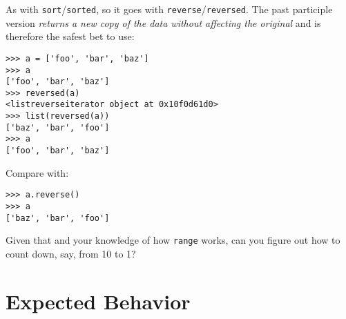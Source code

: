\documentclass[]{article}
\begin{document}
As with \texttt{sort}/\texttt{sorted}, so it goes with
\texttt{reverse}/\texttt{reversed}. The past participle version
\emph{returns a new copy of the data without affecting the original} and
is therefore the safest bet to use:

\begin{verbatim}
>>> a = ['foo', 'bar', 'baz']
>>> a
['foo', 'bar', 'baz']
>>> reversed(a)
<listreverseiterator object at 0x10f0d61d0>
>>> list(reversed(a))
['baz', 'bar', 'foo']
>>> a
['foo', 'bar', 'baz']
\end{verbatim}

Compare with:

\begin{verbatim}
>>> a.reverse()
>>> a
['baz', 'bar', 'foo']
\end{verbatim}

Given that and your knowledge of how \texttt{range} works, can you
figure out how to count down, say, from 10 to 1?

\hypertarget{expected-behavior-1}{%
\section{Expected Behavior}\label{expected-behavior-1}}
\end{document}

